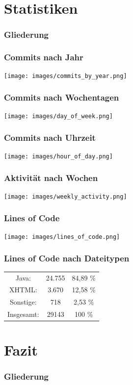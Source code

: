 \documentclass{beamer}
\begin{document}
\section{Statistiken}

\begin{frame}
\frametitle{Gliederung}
\tableofcontents[currentsection]
\end{frame}

\begin{frame}
\frametitle{Commits nach Jahr}
\texttt{[image: images/commits\_by\_year.png]}
\end{frame}

\begin{frame}
\frametitle{Commits nach Wochentagen}
\texttt{[image: images/day\_of\_week.png]}
\end{frame}

\begin{frame}
\frametitle{Commits nach Uhrzeit}
\texttt{[image: images/hour\_of\_day.png]}
\end{frame}

\begin{frame}
\frametitle{Aktivität nach Wochen}
\texttt{[image: images/weekly\_activity.png]}
\end{frame}

\begin{frame} 
  \frametitle{Lines of Code}
  \texttt{[image: images/lines\_of\_code.png]}
\end{frame}

\begin{frame}
\frametitle{Lines of Code nach Dateitypen}
\renewcommand{\arraystretch}{2}
\begin{table}
\centering
\begin{tabular}{ccc}
Java: & 24.755 & 84,89 \%\\
XHTML: & 3.670  & 12,58 \%\\
Sonstige: & 718  & 2,53 \%\\
\hline\hline
Insgesamt: & 29143 & 100 \%\\
\end{tabular}
\end{table}
\end{frame}

\section{Fazit}
\begin{frame}
\frametitle{Gliederung}
\tableofcontents[currentsection]
\end{frame}
\end{document}
